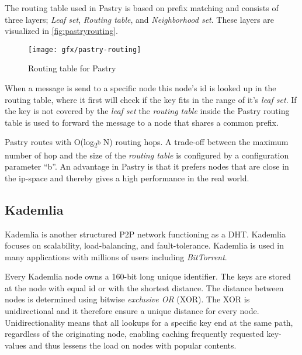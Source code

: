 The routing table used in Pastry is based on prefix matching and consists of three layers; \emph{Leaf set}, \emph{Routing table}, and \emph{Neighborhood set}. These layers are visualized in \autoref{fig:pastryrouting}.
\begin{figure}[bth]
\texttt{[image: gfx/pastry-routing]}
\caption[Routing table for Pastry]{Routing table for Pastry} \label{fig:pastryrouting}
\end{figure}

When a message is send to a specific node this node's id is looked up in the routing table, where it first will check if the key fits in the range of it's \emph{leaf set}. If the key is not covered by the \emph{leaf set} the \emph{routing table} inside the Pastry routing table is used to forward the message to a node that shares a common prefix. 

Pastry routes with O(log\textsubscript{2\textsuperscript b} N) routing hops. A trade-off between the maximum number of hop and the size of the \emph{routing table} is configured by a configuration parameter ``b''.
An advantage in Pastry is that it prefers nodes that are close in the ip-space and thereby gives a high performance in the real world.



\subsection{Kademlia}
Kademlia is another structured P2P network functioning as a DHT. Kademlia focuses on scalability, load-balancing, and fault-tolerance. Kademlia is used in many applications with millions of users including \emph{BitTorrent}.

Every Kademlia node owns a 160-bit long unique identifier. The keys are stored at the node with equal id or with the shortest distance.
The distance between nodes is determined using bitwise \emph{exclusive OR} (XOR). The XOR is unidirectional and it therefore ensure a unique distance for every node. Unidirectionality means that all lookups for a specific key end at the same path, regardless of the originating node, enabling caching frequently requested key-values and thus lessens the load on nodes with popular contents.

